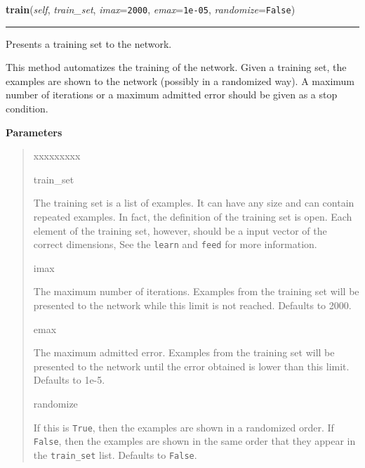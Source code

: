     \label{peach:nn:nn:SOM:train}

    \vspace{0.5ex}

    \begin{boxedminipage}{\textwidth}

    \raggedright \textbf{train}(\textit{self}, \textit{train\_set}, \textit{imax}=\texttt{2000}, \textit{emax}=\texttt{1e-05}, \textit{randomize}=\texttt{False})

    \vspace{-1.5ex}

    \rule{\textwidth}{0.5\fboxrule}

Presents a training set to the network.

This method automatizes the training of the network. Given a training
set, the examples are shown to the network (possibly in a randomized
way). A maximum number of iterations or a maximum admitted error should
be given as a stop condition.
    \vspace{1ex}

      \textbf{Parameters}
      \begin{quote}
        \begin{Ventry}{xxxxxxxxx}

          \item[train\_set]


The training set is a list of examples. It can have any size and can
contain repeated examples. In fact, the definition of the training
set is open. Each element of the training set, however, should be a
input vector of the correct dimensions, See the \texttt{learn} and
\texttt{feed} for more information.
          \item[imax]


The maximum number of iterations. Examples from the training set
will be presented to the network while this limit is not reached.
Defaults to 2000.
          \item[emax]


The maximum admitted error. Examples from the training set will be
presented to the network until the error obtained is lower than this
limit. Defaults to 1e-5.
          \item[randomize]


If this is \texttt{True}, then the examples are shown in a randomized
order. If \texttt{False}, then the examples are shown in the same order
that they appear in the \texttt{train{\_}set} list. Defaults to \texttt{False}.
        \end{Ventry}

      \end{quote}

    \vspace{1ex}

    \end{boxedminipage}

